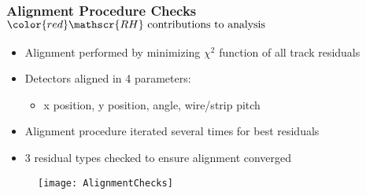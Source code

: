 \begin{frame}%
  \frametitle{Alignment Procedure Checks $\color{red} \mathscr{RH} \text{ contributions to analysis}$}
  
  \begin{itemize}
  \item Alignment performed by minimizing $\chi^2$ function of all
    track residuals
  \item Detectors aligned in 4 parameters:
    \begin{itemize}
    \item x position, y position, angle, wire/strip pitch
    \end{itemize}
    
  \item Alignment procedure iterated several times for best residuals
  \item 3 residual types checked to ensure alignment converged
  \end{itemize}

  \begin{figure}
    \centering
    \texttt{[image: AlignmentChecks]}
  \end{figure}
\end{frame}
